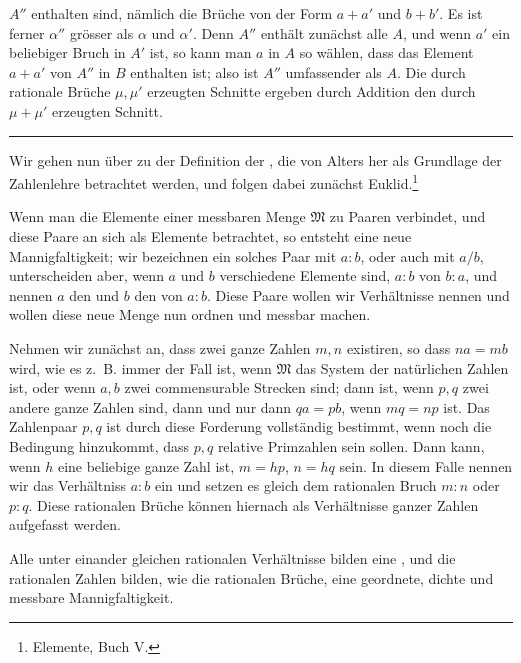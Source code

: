 $A''$ enthalten sind, nämlich die Brüche von der Form $a+a'$ und
$b+b'$. Es ist ferner $\alpha''$ grösser als $\alpha$ und $\alpha'$.
Denn $A''$ enthält zunächst alle $A$, und wenn $a'$ ein beliebiger
Bruch in $A'$ ist, so kann man $a$ in $A$ so wählen, dass das Element
$a+a'$ von $A''$ in $B$ enthalten ist; also ist $A''$ umfassender als
$A$. Die durch rationale Brüche $\mu,\mu'$ erzeugten Schnitte ergeben
durch Addition den durch $\mu+\mu'$ erzeugten Schnitt.

\begin{center}
\rule{0.18\linewidth}{0.4pt}
\end{center}

Wir gehen nun über zu der Definition der , die
von Alters her als Grundlage der Zahlenlehre betrachtet werden, und
folgen dabei zunächst Euklid.\setcounter{footnote}{0}\footnote{Elemente, Buch V.}

Wenn man die Elemente einer messbaren Menge $\mathfrak M$ zu Paaren
verbindet, und diese Paare an sich als Elemente betrachtet, so
entsteht eine neue Mannigfaltigkeit; wir bezeichnen ein solches Paar
mit $a:b$, oder auch mit $a/b$, unterscheiden aber, wenn $a$ und $b$
verschiedene Elemente sind, $a:b$ von $b:a$, und nennen $a$ den
 und $b$ den  von $a:b$. Diese
Paare wollen wir Verhältnisse nennen und wollen diese neue Menge nun
ordnen und messbar machen.

Nehmen wir zunächst an, dass zwei ganze Zahlen $m,n$ existiren, so
dass $na=mb$ wird, wie es z.~B. immer der Fall ist, wenn $\mathfrak M$
das System der natürlichen Zahlen ist, oder wenn $a,b$ zwei
commensurable Strecken sind; dann ist, wenn $p,q$ zwei andere ganze
Zahlen sind, dann und nur dann $qa=pb$, wenn $mq=np$ ist. Das
Zahlenpaar $p,q$ ist durch diese Forderung vollständig bestimmt, wenn
noch die Bedingung hinzukommt, dass $p,q$ relative Primzahlen sein
sollen. Dann kann, wenn $h$ eine beliebige ganze Zahl ist, $m=hp$,
$n=hq$ sein. In diesem Falle nennen wir das Verhältniss $a:b$ ein
 und setzen es gleich dem rationalen Bruch $m:n$
oder $p:q$. Diese rationalen Brüche können hiernach als Verhältnisse
ganzer Zahlen aufgefasst werden.

Alle unter einander gleichen rationalen Verhältnisse bilden eine
, und die rationalen Zahlen bilden, wie die
rationalen Brüche, eine geordnete, dichte und messbare
Mannigfaltigkeit.
